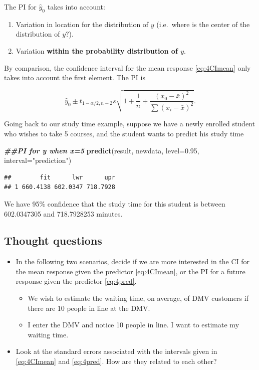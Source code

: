 \documentclass[
]{book}
\newenvironment{Shaded}{\begin{snugshade}}{\end{snugshade}}
\newcommand{\AttributeTok}[1]{\textcolor[rgb]{0.13,0.29,0.53}{#1}}
\newcommand{\DocumentationTok}[1]{\textcolor[rgb]{0.56,0.35,0.01}{\textbf{\textit{#1}}}}
\newcommand{\FloatTok}[1]{\textcolor[rgb]{0.00,0.00,0.81}{#1}}
\newcommand{\FunctionTok}[1]{\textcolor[rgb]{0.13,0.29,0.53}{\textbf{#1}}}
\newcommand{\NormalTok}[1]{#1}
\newcommand{\StringTok}[1]{\textcolor[rgb]{0.31,0.60,0.02}{#1}}
\providecommand{\tightlist}{%
  \setlength{\itemsep}{0pt}\setlength{\parskip}{0pt}}
\begin{document}
The PI for \(\hat{y}_0\) takes into account:

\begin{enumerate}
\def\labelenumi{\arabic{enumi}.}
\tightlist
\item
  Variation in location for the distribution of \(y\) (i.e.~where is the center of the distribution of \(y\)?).
\item
  Variation \textbf{within the probability distribution of \(y\)}.
\end{enumerate}

By comparison, the confidence interval for the mean response \eqref{eq:4CImean} only takes into account the first element. The PI is

\begin{equation} 
\hat{y}_0\pm t_{1-\alpha/2,n-2}s \sqrt{1+\frac{1}{n} +
\frac{(x_0-\bar{x})^2}{\sum(x_i-\bar{x})^2}}.
\label{eq:4pred}
\end{equation}

Going back to our study time example, suppose we have a newly enrolled student who wishes to take 5 courses, and the student wants to predict his study time

\begin{Shaded}
\begin{Highlighting}[]
\DocumentationTok{\#\#PI for y when x=5}
\FunctionTok{predict}\NormalTok{(result, newdata, }\AttributeTok{level=}\FloatTok{0.95}\NormalTok{, }\AttributeTok{interval=}\StringTok{"prediction"}\NormalTok{)}
\end{Highlighting}
\end{Shaded}

\begin{verbatim}
##        fit      lwr      upr
## 1 660.4138 602.0347 718.7928
\end{verbatim}

We have 95\% confidence that the study time for this student is between 602.0347305 and 718.7928253 minutes.

\subsection{Thought questions}\label{thought-questions-1}

\begin{itemize}
\item
  In the following two scenarios, decide if we are more interested in the CI for the mean response given the predictor \eqref{eq:4CImean}, or the PI for a future response given the predictor \eqref{eq:4pred}.

  \begin{itemize}
  \item
    We wish to estimate the waiting time, on average, of DMV customers if there are 10 people in line at the DMV.
  \item
    I enter the DMV and notice 10 people in line. I want to estimate my waiting time.
  \end{itemize}
\item
  Look at the standard errors associated with the intervals given in \eqref{eq:4CImean} and \eqref{eq:4pred}. How are they related to each other?
\end{itemize}
\end{document}
